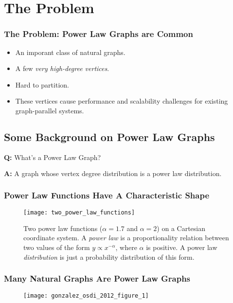 \section{The Problem}

\begin{frame}
  \frametitle{The Problem: Power Law Graphs are Common}
  \begin{itemize}
      \item An imporant class of natural graphs.
      \item A few \textit{very high-degree vertices}.
      \item Hard to partition.
      \item These vertices cause performance and scalability challenges for
            existing graph-parallel systems.
  \end{itemize}
\end{frame}

\subsection{Some Background on Power Law Graphs}

\begin{frame}
    \textbf{Q:} What's a Power Law Graph?

    \textbf{A:} A graph whose vertex degree distribution is a power law
    distribution.
\end{frame}

\begin{frame}
  \frametitle{Power Law Functions Have A Characteristic Shape}
  \begin{figure}
    \centering
    \texttt{[image: two\_power\_law\_functions]}
    \caption{Two power law functions ($\alpha = 1.7$ and $\alpha = 2$) on a
             Cartesian coordinate system. A \textit{power law} is a
             proportionality relation between two values of the form
             $y \propto x^{-\alpha}$, where $\alpha$ is positive. A power law
             \textit{distribution} is just a probability distribution of this
             form.}
  \end{figure}
\end{frame}

\begin{frame}
  \frametitle{Many Natural Graphs Are Power Law Graphs}
  \begin{figure}
    \centering
    \texttt{[image: gonzalez\_osdi\_2012\_figure\_1]}
    \caption{\cite[OSDI '12]{gonzalez2012powergraph}}
  \end{figure}
\end{frame}

